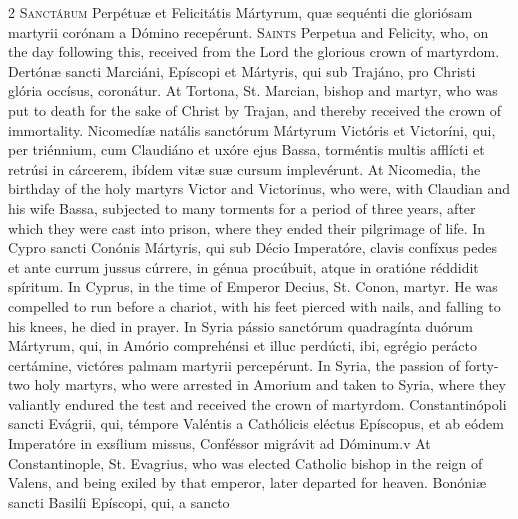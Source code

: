 \begin{paracol}{2}
\lettrine[lines=2]{S}{anctárum} Perpétuæ et Felicitátis Mártyrum, quæ 
 sequénti die gloriósam martyrii corónam a Dómino recepérunt.
\switchcolumn
{}
\lettrine[lines=2]{S}{aints} Perpetua and Felicity, who, on the day following this, received from 
 the Lord the glorious crown of martyrdom.
\switchcolumn*
{}
Dertónæ sancti Marciáni, Epíscopi et Mártyris, 
 qui sub Trajáno, pro Christi glória occísus, coronátur.
\switchcolumn
{}
At Tortona, St. Marcian, bishop and martyr, who was put to death for the 
 sake of Christ by Trajan, and thereby received the crown of immortality.
\switchcolumn*
{}
Nicomedíæ natális sanctórum Mártyrum Victóris 
 et Victoríni, qui, per triénnium, cum Claudiáno et uxóre ejus Bassa, 
 torméntis multis afflícti et retrúsi in cárcerem, ibídem vitæ suæ cursum 
 implevérunt.
\switchcolumn
{}
At Nicomedia, the birthday of the holy martyrs Victor and Victorinus, who 
 were, with Claudian and his wife Bassa, subjected to many torments for a 
 period of three years, after which they were cast into prison, where they 
 ended their pilgrimage of life.
\switchcolumn*
{}
In Cypro sancti Conónis Mártyris, qui sub Décio Imperatóre, clavis confíxus 
 pedes et ante currum jussus cúrrere, in génua procúbuit, atque in oratióne 
 réddidit spíritum.
\switchcolumn
{}
In Cyprus, in the time of Emperor Decius, St. Conon, martyr. He was 
 compelled to run before a chariot, with his feet pierced with nails, and 
 falling to his knees, he died in prayer.
\switchcolumn*
{}
In Syria pássio sanctórum quadragínta duórum Mártyrum, qui, in Amório 
 comprehénsi et illuc perdúcti, ibi, egrégio perácto certámine, victóres 
 palmam martyrii percepérunt.
\switchcolumn
{}
In Syria, the passion of forty-two holy martyrs, who were arrested in 
 Amorium and taken to Syria, where they valiantly endured the test and 
 received the crown of martyrdom.
\switchcolumn*
{}
Constantinópoli sancti Evágrii, qui, témpore Valéntis a Cathólicis eléctus 
 Epíscopus, et ab eódem Imperatóre in exsílium missus, Conféssor migrávit ad 
 Dóminum.v
\switchcolumn
{}
At Constantinople, St. Evagrius, who was elected Catholic bishop in the 
 reign of Valens, and being exiled by that emperor, later departed for 
 heaven.
\switchcolumn*
{}
Bonóniæ sancti Basilíi Epíscopi, qui, a sancto 

\end{paracol}
